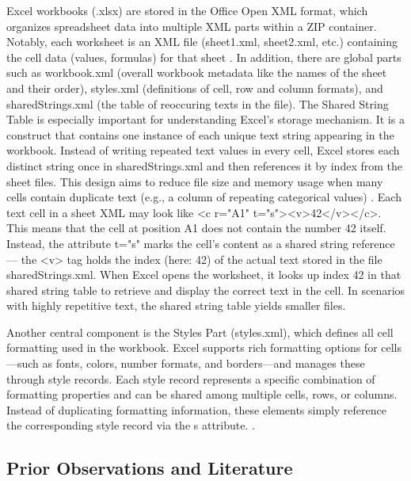 \documentclass[conference]{IEEEtran}
\begin{document}
Excel workbooks (.xlsx) are stored in the Office Open XML format, which organizes spreadsheet data into multiple XML parts within a ZIP container. Notably, each worksheet is an XML file (sheet1.xml, sheet2.xml, etc.) containing the cell data (values, formulas) for that sheet  \cite{Microsoft2025SpreadsheetMLStructure}. In addition, there are global parts such as workbook.xml (overall workbook metadata like the names of the sheet and their order), styles.xml (definitions of cell, row and column formats), and sharedStrings.xml (the table of reoccuring texts in the file). The Shared String Table is especially important for understanding Excel’s storage mechanism. It is a construct that contains one instance of each unique text string appearing in the workbook. Instead of writing repeated text values in every cell, Excel stores each distinct string once in sharedStrings.xml and then references it by index from the sheet files. This design aims to reduce file size and memory usage when many cells contain duplicate text (e.g., a column of repeating categorical values)  \cite{Microsoft2025SharedStringTableClass, FasterCapital2024SharedStrings}. Each text cell in a sheet XML may look like <c r="A1" t="s"><v>42</v></c>. This means that the cell at position A1 does not contain the number 42 itself. Instead, the attribute t="s" marks the cell's content as a shared string reference — the <v> tag holds the index (here: 42) of the actual text stored in the file sharedStrings.xml. When Excel opens the worksheet, it looks up index 42 in that shared string table to retrieve and display the correct text in the cell. In scenarios with highly repetitive text, the shared string table yields smaller files.

Another central component is the Styles Part (styles.xml), which defines all cell formatting used in the workbook.
Excel supports rich formatting options for cells—such as fonts, colors, number formats, and borders—and manages these through style records. Each style record represents a specific combination of formatting properties and can be shared among multiple cells, rows, or columns.
Instead of duplicating formatting information, these elements simply reference the corresponding style record via the s attribute. \cite{Microsoft2025CellFormatClass}.

\subsection{Prior Observations and Literature}
\end{document}
